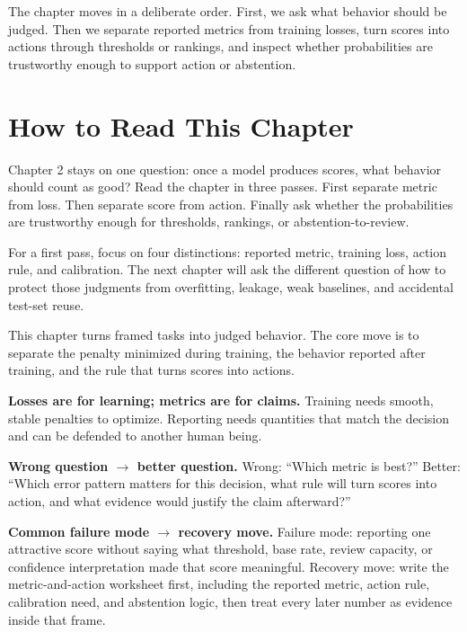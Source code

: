 The chapter moves in a deliberate order. First, we ask what behavior should be judged. Then we separate reported metrics from training losses, turn scores into actions through thresholds or rankings, and inspect whether probabilities are trustworthy enough to support action or abstention.

\section*{How to Read This Chapter}

Chapter 2 stays on one question: once a model produces scores, what behavior should count as good? Read the chapter in three passes. First separate metric from loss. Then separate score from action. Finally ask whether the probabilities are trustworthy enough for thresholds, rankings, or abstention-to-review.

\begin{decisionbox}
For a first pass, focus on four distinctions: reported metric, training loss, action rule, and calibration. The next chapter will ask the different question of how to protect those judgments from overfitting, leakage, weak baselines, and accidental test-set reuse.
\end{decisionbox}

\begin{problemsolvinglens}
This chapter turns framed tasks into judged behavior. The core move is to separate the penalty minimized during training, the behavior reported after training, and the rule that turns scores into actions.
\end{problemsolvinglens}

\begin{thinkingtool}
\textbf{Losses are for learning; metrics are for claims.} Training needs smooth, stable penalties to optimize. Reporting needs quantities that match the decision and can be defended to another human being.
\end{thinkingtool}

\begin{thinkingtool}
\textbf{Wrong question $\rightarrow$ better question.} Wrong: ``Which metric is best?'' Better: ``Which error pattern matters for this decision, what rule will turn scores into action, and what evidence would justify the claim afterward?''
\end{thinkingtool}

\begin{thinkingtool}
\textbf{Common failure mode $\rightarrow$ recovery move.} Failure mode: reporting one attractive score without saying what threshold, base rate, review capacity, or confidence interpretation made that score meaningful. Recovery move: write the metric-and-action worksheet first, including the reported metric, action rule, calibration need, and abstention logic, then treat every later number as evidence inside that frame.
\end{thinkingtool}

